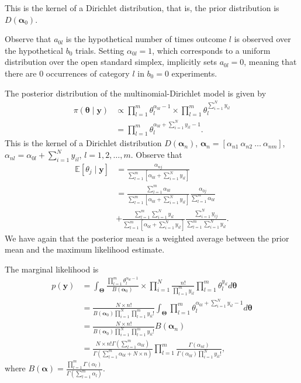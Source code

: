 \begin{enumerate}
This is the kernel of a Dirichlet distribution, that is, the prior distribution is $D(\bm{\alpha}_0)$.

Observe that \( a_{0l} \) is the hypothetical number of times outcome \( l \) is observed over the hypothetical \( b_0 \) trials. Setting \( \alpha_{0l} = 1 \), which corresponds to a uniform distribution over the open standard simplex, implicitly sets \( a_{0l} = 0 \), meaning that there are 0 occurrences of category \( l \) in \( b_0 = 0 \) experiments.  

The posterior distribution of the multinomial-Dirichlet model is given by
\begin{align}
	\pi(\bm{\theta}\mid \bm{y})&\propto \prod_{l=1}^m \theta_l^{\alpha_{0l}-1}\times\prod_{l=1}^m \theta_l^{\sum_{i=1}^{N} y_{il}}\nonumber\\
	&=\prod_{l=1}^m \theta_l^{\alpha_{0l}+\sum_{i=1}^{N} y_{il}-1}\nonumber.
\end{align}
This is the kernel of a Dirichlet distribution $D(\bm{\alpha}_n)$, $\bm{\alpha}_n=\left[\alpha_{n1} \ \alpha_{n2} \ \dots \ \alpha_{nm}\right]$, $\alpha_{nl}=\alpha_{0l}+\sum_{i=1}^{N}y_{il}$, $l=1,2,\dots,m$. Observe that
\begin{align}
	\mathbb{E}[\theta_{j}\mid \bm{y}]&=\frac{\alpha_{nj}}{\sum_{l=1}^m \left[\alpha_{0l}+\sum_{i=1}^N y_{il}\right]}\nonumber\\
	&=\frac{\sum_{l=1}^m \alpha_{0l}}{\sum_{l=1}^m \left[\alpha_{0l}+\sum_{i=1}^N y_{il}\right]}\frac{\alpha_{0j}}{\sum_{l=1}^m \alpha_{0l}}\nonumber\\
	&+\frac{\sum_{l=1}^m\sum_{i=1}^N y_{il}}{\sum_{l=1}^m \left[\alpha_{0l}+\sum_{i=1}^N y_{il}\right]}\frac{\sum_{i=1}^N y_{ij}}{\sum_{l=1}^m\sum_{i=1}^N y_{il}}.\nonumber
\end{align}
We have again that the posterior mean is a weighted average between the prior mean and the maximum likelihood estimate.

The marginal likelihood is
\begin{align}
	p(\bm{y})&=\int_{\bm{\Theta}}\frac{\prod_{l=1}^m \theta_l^{\alpha_{0l}-1}}{B(\bm{\alpha}_0)}\times \prod_{i=1}^N\frac{n!}{\prod_{l=1}^m y_{il}}\prod_{l=1}^m \theta_{l}^{y_{il}}d\bm{\theta}\nonumber\\
	&=\frac{N\times n!}{B(\bm{\alpha}_0)\prod_{i=1}^N\prod_{l=1}^m y_{il}!}\int_{\bm{\Theta}} \prod_{l=1}^m \theta_l^{\alpha_{0l}+\sum_{i=1}^N y_{il}-1} d\bm{\theta}\nonumber\\
	&=\frac{N\times n!}{B(\bm{\alpha}_0)\prod_{i=1}^N\prod_{l=1}^m y_{il}!}B(\bm{\alpha}_n)\nonumber\\
	&=\frac{N\times n! \Gamma\left(\sum_{l=1}^m\nonumber \alpha_{0l}\right)}{\Gamma\left(\sum_{l=1}^m \alpha_{0l}+N\times n\right)}\prod_{l=1}^m \frac{\Gamma\left( \alpha_{nl}\right)}{\Gamma\left(\alpha_{0l}\right)\prod_{i=1}^N y_{il}!},\nonumber
\end{align}
where $B(\bm{\alpha})=\frac{\prod_{l=1}^m\Gamma(\alpha_l)}{\Gamma\left(\sum_{l=1}^m \alpha_l\right)}$.


\end{enumerate}
